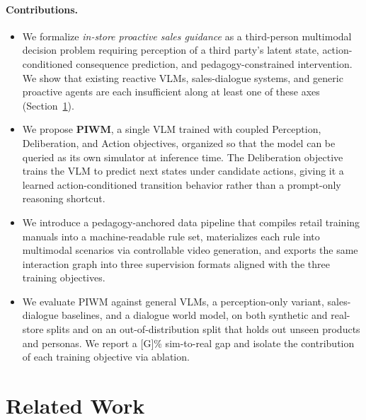 \documentclass{article}
\begin{document}
\paragraph{Contributions.}
\begin{itemize}
  \item We formalize \emph{in-store proactive sales guidance} as a third-person multimodal decision problem requiring perception of a third party's latent state, action-conditioned consequence prediction, and pedagogy-constrained intervention. We show that existing reactive VLMs, sales-dialogue systems, and generic proactive agents are each insufficient along at least one of these axes (Section~\ref{sec:related}).
  \item We propose \textbf{PIWM}, a single VLM trained with coupled Perception, Deliberation, and Action objectives, organized so that the model can be queried as its own simulator at inference time. The Deliberation objective trains the VLM to predict next states under candidate actions, giving it a learned action-conditioned transition behavior rather than a prompt-only reasoning shortcut.
  \item We introduce a pedagogy-anchored data pipeline that compiles retail training manuals into a machine-readable rule set, materializes each rule into multimodal scenarios via controllable video generation, and exports the same interaction graph into three supervision formats aligned with the three training objectives.
  \item We evaluate PIWM against general VLMs, a perception-only variant, sales-dialogue baselines, and a dialogue world model, on both synthetic and real-store splits and on an out-of-distribution split that holds out unseen products and personas. We report a [G]\% sim-to-real gap and isolate the contribution of each training objective via ablation.
\end{itemize}


\section{Related Work}
\label{sec:related}
\end{document}
